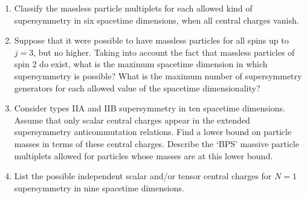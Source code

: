 

\begin{enumerate}
  \item Classify the massless particle multiplets for each allowed kind
  of supersymmetry in six spacetime dimensions, when all central charges
  vanish.

  \item Suppose that it were possible to have massless particles for
  all spins up to $j=3$, but no higher. Taking into account the fact
  that massless particles of spin 2 do exist, what is the maximum
  spacetime dimension in which supersymmetry is possible? What is the
  maximum number of supersymmetry generators for each allowed value of
  the spacetime dimensionality?

  \item Consider types IIA and IIB supersymmetry in ten spacetime
  dimensions. Assume that only scalar central charges appear in the
  extended supersymmetry anticommutation relations. Find a lower bound
  on particle masses in terms of these central charges. Describe the
  `BPS' massive particle multiplets allowed for particles whose masses
  are at this lower bound.

  \item List the possible independent scalar and/or tensor central
  charges for $N=1$ supersymmetry in nine spacetime dimensions.
\end{enumerate}


